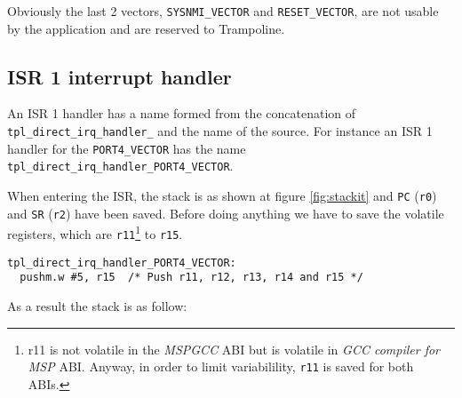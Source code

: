 \documentclass[11pt, oneside]{article}   	%
\begin{document}
Obviously the last 2 vectors, \lstinline{SYSNMI_VECTOR} and \lstinline{RESET_VECTOR}, are not usable by the application and are reserved to Trampoline.

\subsection{ISR 1 interrupt handler}

An ISR 1 handler has a name formed from the concatenation of \lstinline{tpl_direct_irq_handler_} and the name of the source. For instance an ISR 1 handler for the \lstinline{PORT4_VECTOR} has the name \lstinline{tpl_direct_irq_handler_PORT4_VECTOR}.

When entering the ISR, the stack is as shown at figure \ref{fig:stackit} and \lstinline{PC} (\lstinline{r0}) and \lstinline{SR} (\lstinline{r2}) have been saved. Before doing anything we have to save the volatile registers, which are \lstinline{r11}\footnote{r11 is not volatile in the \emph{MSPGCC} ABI but is volatile in \emph{GCC compiler for MSP} ABI. Anyway, in order to limit variabilility, \lstinline{r11} is saved for both ABIs.} to \lstinline{r15}.

\begin{lstlisting}[basicstyle=\footnotesize\ttfamily]
tpl_direct_irq_handler_PORT4_VECTOR:
  pushm.w #5, r15  /* Push r11, r12, r13, r14 and r15 */
\end{lstlisting}

As a result the stack is as follow:

\begin{center}
\end{center}
\end{document}
